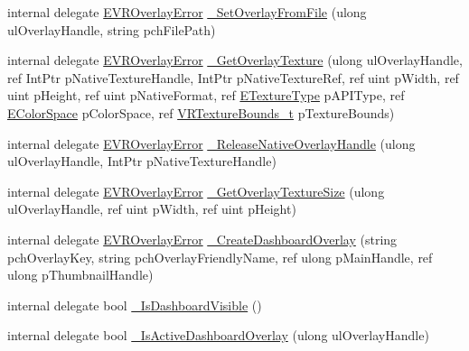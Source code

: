 \begin{DoxyCompactItemize}
\item 
internal delegate \mbox{\hyperlink{namespace_valve_1_1_v_r_aaee5c5144f42b7969d45b854f51b0c18}{E\+V\+R\+Overlay\+Error}} \mbox{\hyperlink{struct_valve_1_1_v_r_1_1_i_v_r_overlay_a7651c5d114e08eb5cd7813524caf5220}{\+\_\+\+Set\+Overlay\+From\+File}} (ulong ul\+Overlay\+Handle, string pch\+File\+Path)
\item 
internal delegate \mbox{\hyperlink{namespace_valve_1_1_v_r_aaee5c5144f42b7969d45b854f51b0c18}{E\+V\+R\+Overlay\+Error}} \mbox{\hyperlink{struct_valve_1_1_v_r_1_1_i_v_r_overlay_a4736d358cfb1631b67f42d25c9850da3}{\+\_\+\+Get\+Overlay\+Texture}} (ulong ul\+Overlay\+Handle, ref Int\+Ptr p\+Native\+Texture\+Handle, Int\+Ptr p\+Native\+Texture\+Ref, ref uint p\+Width, ref uint p\+Height, ref uint p\+Native\+Format, ref \mbox{\hyperlink{namespace_valve_1_1_v_r_a9481de640e411eef49c2f3fdca82eaa3}{E\+Texture\+Type}} p\+A\+P\+I\+Type, ref \mbox{\hyperlink{namespace_valve_1_1_v_r_aeb0fba37ba28d8ca276d7c10f01809ac}{E\+Color\+Space}} p\+Color\+Space, ref \mbox{\hyperlink{struct_valve_1_1_v_r_1_1_v_r_texture_bounds__t}{V\+R\+Texture\+Bounds\+\_\+t}} p\+Texture\+Bounds)
\item 
internal delegate \mbox{\hyperlink{namespace_valve_1_1_v_r_aaee5c5144f42b7969d45b854f51b0c18}{E\+V\+R\+Overlay\+Error}} \mbox{\hyperlink{struct_valve_1_1_v_r_1_1_i_v_r_overlay_a688ff280dfb7e1797a832b5e26ae7dc2}{\+\_\+\+Release\+Native\+Overlay\+Handle}} (ulong ul\+Overlay\+Handle, Int\+Ptr p\+Native\+Texture\+Handle)
\item 
internal delegate \mbox{\hyperlink{namespace_valve_1_1_v_r_aaee5c5144f42b7969d45b854f51b0c18}{E\+V\+R\+Overlay\+Error}} \mbox{\hyperlink{struct_valve_1_1_v_r_1_1_i_v_r_overlay_af3140dc6e2be438f6c5989c7e49f5408}{\+\_\+\+Get\+Overlay\+Texture\+Size}} (ulong ul\+Overlay\+Handle, ref uint p\+Width, ref uint p\+Height)
\item 
internal delegate \mbox{\hyperlink{namespace_valve_1_1_v_r_aaee5c5144f42b7969d45b854f51b0c18}{E\+V\+R\+Overlay\+Error}} \mbox{\hyperlink{struct_valve_1_1_v_r_1_1_i_v_r_overlay_ad5cf0a30a2b92327fbcd10781baa7b2e}{\+\_\+\+Create\+Dashboard\+Overlay}} (string pch\+Overlay\+Key, string pch\+Overlay\+Friendly\+Name, ref ulong p\+Main\+Handle, ref ulong p\+Thumbnail\+Handle)
\item 
internal delegate bool \mbox{\hyperlink{struct_valve_1_1_v_r_1_1_i_v_r_overlay_ae7389cf53d82e68927097e901093c534}{\+\_\+\+Is\+Dashboard\+Visible}} ()
\item 
internal delegate bool \mbox{\hyperlink{struct_valve_1_1_v_r_1_1_i_v_r_overlay_a243e44cc1a50df0d00c3fd8f681ab050}{\+\_\+\+Is\+Active\+Dashboard\+Overlay}} (ulong ul\+Overlay\+Handle)

\end{DoxyCompactItemize}
